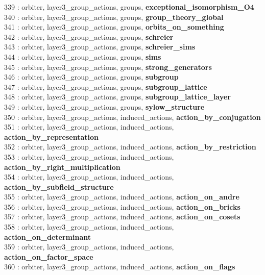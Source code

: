 339 : orbiter, layer3\_group\_actions, groups, {\bf exceptional\_isomorphism\_O4}\\
340 : orbiter, layer3\_group\_actions, groups, {\bf group\_theory\_global}\\
341 : orbiter, layer3\_group\_actions, groups, {\bf orbits\_on\_something}\\
342 : orbiter, layer3\_group\_actions, groups, {\bf schreier}\\
343 : orbiter, layer3\_group\_actions, groups, {\bf schreier\_sims}\\
344 : orbiter, layer3\_group\_actions, groups, {\bf sims}\\
345 : orbiter, layer3\_group\_actions, groups, {\bf strong\_generators}\\
346 : orbiter, layer3\_group\_actions, groups, {\bf subgroup}\\
347 : orbiter, layer3\_group\_actions, groups, {\bf subgroup\_lattice}\\
348 : orbiter, layer3\_group\_actions, groups, {\bf subgroup\_lattice\_layer}\\
349 : orbiter, layer3\_group\_actions, groups, {\bf sylow\_structure}\\
350 : orbiter, layer3\_group\_actions, induced\_actions, {\bf action\_by\_conjugation}\\
351 : orbiter, layer3\_group\_actions, induced\_actions, {\bf action\_by\_representation}\\
352 : orbiter, layer3\_group\_actions, induced\_actions, {\bf action\_by\_restriction}\\
353 : orbiter, layer3\_group\_actions, induced\_actions, {\bf action\_by\_right\_multiplication}\\
354 : orbiter, layer3\_group\_actions, induced\_actions, {\bf action\_by\_subfield\_structure}\\
355 : orbiter, layer3\_group\_actions, induced\_actions, {\bf action\_on\_andre}\\
356 : orbiter, layer3\_group\_actions, induced\_actions, {\bf action\_on\_bricks}\\
357 : orbiter, layer3\_group\_actions, induced\_actions, {\bf action\_on\_cosets}\\
358 : orbiter, layer3\_group\_actions, induced\_actions, {\bf action\_on\_determinant}\\
359 : orbiter, layer3\_group\_actions, induced\_actions, {\bf action\_on\_factor\_space}\\
360 : orbiter, layer3\_group\_actions, induced\_actions, {\bf action\_on\_flags}\\
